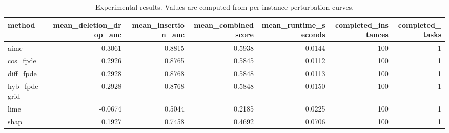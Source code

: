 \begin{table}[t]
\caption{Experimental results. Values are computed from per-instance perturbation curves.}
\label{tab:main_results_computed}
\centering
\begin{tabular}{lrrrrrr}
\toprule
method & mean\_deletion\_drop\_auc & mean\_insertion\_auc & mean\_combined\_score & mean\_runtime\_seconds & completed\_instances & completed\_tasks \\
\midrule
aime & 0.3061 & 0.8815 & 0.5938 & 0.0144 & 100 & 1 \\
cos\_fpde & 0.2926 & 0.8765 & 0.5845 & 0.0112 & 100 & 1 \\
diff\_fpde & 0.2928 & 0.8768 & 0.5848 & 0.0113 & 100 & 1 \\
hyb\_fpde\_grid & 0.2928 & 0.8768 & 0.5848 & 0.0150 & 100 & 1 \\
lime & -0.0674 & 0.5044 & 0.2185 & 0.0225 & 100 & 1 \\
shap & 0.1927 & 0.7458 & 0.4692 & 0.0706 & 100 & 1 \\
\bottomrule
\end{tabular}

\end{table}

